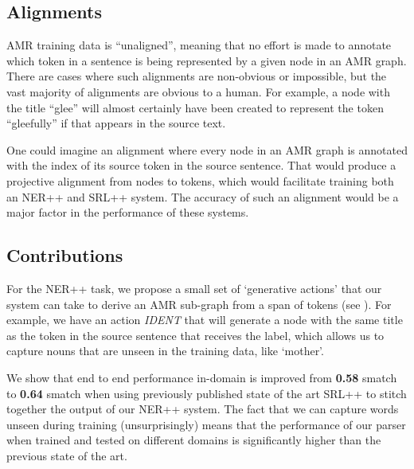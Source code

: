 \documentclass[11pt]{article}
\begin{document}

\subsection{Alignments}

AMR training data is ``unaligned'', meaning that no effort is made to annotate which token in a sentence is being represented by a given node in an AMR graph. There are cases where such alignments are non-obvious or impossible, but the vast majority of alignments are obvious to a human. For example, a node with the title ``glee'' will almost certainly have been created to represent the token ``gleefully'' if that appears in the source text.

One could imagine an alignment where every node in an AMR graph is annotated with the index of its source token in the source sentence. That would produce a projective alignment from nodes to tokens, which would facilitate training both an NER++ and SRL++ system. The accuracy of such an alignment would be a major factor in the performance of these systems.

\subsection{Contributions}

For the NER++ task, we propose a small set of `generative actions' that our system can take to derive an AMR sub-graph from a span of tokens (see ). For example, we have an action \textit{IDENT} that will generate a node with the same title as the token in the source sentence that receives the label, which allows us to capture nouns that are unseen in the training data, like `mother'. 

We show that end to end performance in-domain is improved from \textbf{0.58} smatch to \textbf{0.64} smatch when using previously published state of the art SRL++ \cite{Flanigan:14} to stitch together the output of our NER++ system. The fact that we can capture words unseen during training (unsurprisingly) means that the performance of our parser when trained and tested on different domains is significantly higher than the previous state of the art.
\end{document}
